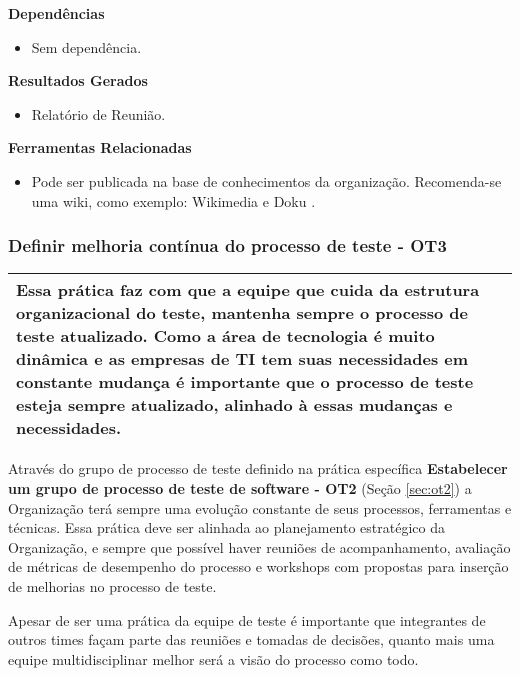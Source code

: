 \textbf{Dependências}
\begin{itemize}
    \item Sem dependência.
\end{itemize}

\textbf{Resultados Gerados}
\begin{itemize}
    \item Relatório de Reunião.
\end{itemize}

\textbf{Ferramentas Relacionadas}
\begin{itemize}
    \item Pode ser publicada na base de conhecimentos da organização. Recomenda-se uma wiki, como exemplo: Wikimedia \cite{Wikimedia} e Doku \cite{Doku}.
\end{itemize}

\subsubsection{Definir melhoria contínua do processo de teste - OT3}
\label{sec:ot3}

\begin{table}[H]
\centering
\begin{tabular}{|p{130mm}|}
\hline
Essa prática faz com que a equipe que cuida da estrutura organizacional do teste, mantenha sempre o processo de teste atualizado. Como a área de tecnologia é muito dinâmica e as empresas de TI tem suas necessidades em constante mudança é importante que o processo de teste esteja sempre atualizado, alinhado à essas mudanças e necessidades. \\ 
\hline
\end{tabular}
\end{table}

Através do grupo de processo de teste definido na prática específica \textbf{Estabelecer um grupo de processo de teste de software - OT2} (Seção \ref{sec:ot2}) a Organização terá sempre uma evolução constante de seus processos, ferramentas e técnicas. Essa prática deve ser alinhada ao planejamento estratégico da Organização, e sempre que possível haver reuniões de acompanhamento, avaliação de métricas de desempenho do processo e workshops com propostas para inserção de melhorias no processo de teste.

Apesar de ser uma prática da equipe de teste é importante que integrantes de outros times façam parte das reuniões e tomadas de decisões, quanto mais uma equipe multidisciplinar melhor será a visão do processo como todo.

